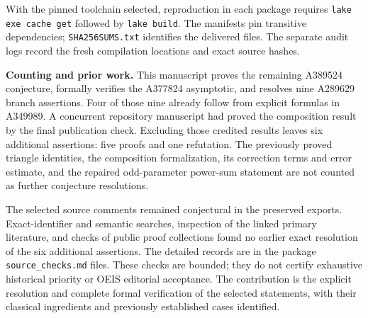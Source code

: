 \documentclass[11pt]{article}
\begin{document}
With the pinned toolchain selected, reproduction in each package requires
\texttt{lake exe cache get} followed by \texttt{lake build}.
The manifests pin transitive dependencies; \texttt{SHA256SUMS.txt}
identifies the delivered files. The separate audit logs record the fresh
compilation locations and exact source hashes.

\textbf{Counting and prior work.}
This manuscript proves the remaining A389524 conjecture, formally verifies
the A377824 asymptotic, and resolves nine A289629 branch assertions. Four
of those nine already follow from explicit formulas in A349989. A concurrent
repository manuscript had proved the composition result by the final
publication check. Excluding those credited results leaves six additional
assertions: five proofs and one refutation. The previously proved triangle
identities, the composition formalization, its correction terms and error
estimate, and the repaired odd-parameter power-sum statement are not counted
as further conjecture resolutions.

The selected source comments remained conjectural in the preserved
exports. Exact-identifier and semantic searches, inspection of the linked
primary literature, and checks of public proof collections found no
earlier exact resolution of the six additional assertions. The detailed
records are in the package \texttt{source\_checks.md} files. These checks
are bounded; they do not certify exhaustive historical priority or OEIS
editorial acceptance. The contribution is the explicit resolution and
complete formal verification of the selected statements, with their
classical ingredients and previously established cases identified.
\end{document}
